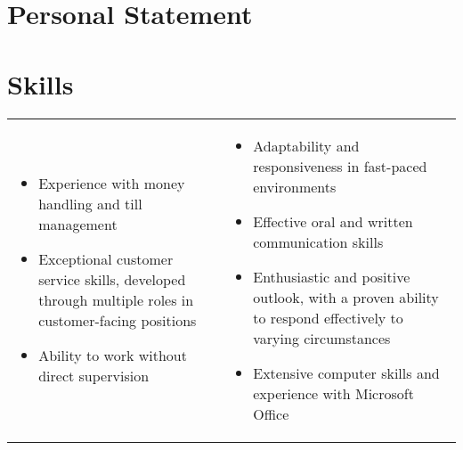 \documentclass[letterpaper]{twentysecondcv} %
\begin{document}




\makeprofile %



\section*{Personal Statement}

\personalStatement





\section*{Skills}

\cvtags



\begin{tabularx}{\linewidth}{XX}
	\begin{itemize}
		\item Experience with money handling and till management
		\item Exceptional customer service skills, developed through multiple roles in customer-facing positions
		\item Ability to work without direct supervision
	\end{itemize} & 
	\begin{itemize}
		\item Adaptability and responsiveness in fast-paced environments
		\item Effective oral and written communication skills
		\item Enthusiastic and positive outlook, with a proven ability to respond effectively to varying circumstances
		\item Extensive computer skills and experience with Microsoft Office
	\end{itemize} \\
\end{tabularx}
\end{document}
